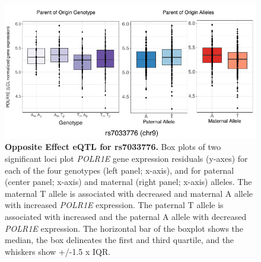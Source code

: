 \begin{figure}[!htb]
\centering
\includegraphics[width=5in]{img/ch02/fig-s15.pdf}
\caption[Opposite Effect eQTL for rs7033776.]{\textbf{Opposite Effect eQTL for rs7033776.} Box plots of two significant loci plot \emph{POLR1E} gene expression residuals (y-axes) for each of the four genotypes (left panel; x-axis), and for paternal (center panel; x-axis) and maternal (right panel; x-axis) alleles. The maternal T allele is associated with decreased and maternal A allele with increased \emph{POLR1E} expression. The paternal T allele is associated with increased and the paternal A allele with decreased \emph{POLR1E} expression. The horizontal bar of the boxplot shows the median, the box delineates the first and third quartile, and the whiskers show +/-1.5 x IQR.}
\label{fig:fig-s15}
\end{figure}













